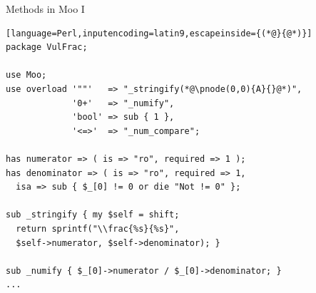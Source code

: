 \documentclass[ngerman,xcolor={table,dvipsnames},scriptsizeer,compress,hyperref={bookmarks,colorlinks}]{beamer}
\begin{document}
\begin{frame}[t,fragile]

\begin{columns}[t]
\begin{column}{.8\textwidth}
\begin{block}{Methods in Moo I}
\scriptsize
\begin{lstlisting}[language=Perl,inputencoding=latin9,escapeinside={(*@}{@*)}]
package VulFrac;

use Moo;
use overload '""'   => "_stringify(*@\pnode(0,0){A}{}@*)",
             '0+'   => "_numify",
             'bool' => sub { 1 },
             '<=>'  => "_num_compare";

has numerator => ( is => "ro", required => 1 );
has denominator => ( is => "ro", required => 1,
  isa => sub { $_[0] != 0 or die "Not != 0" };

sub _stringify { my $self = shift;
  return sprintf("\\frac{%s}{%s}",
  $self->numerator, $self->denominator); }

sub _numify { $_[0]->numerator / $_[0]->denominator; }
...
\end{lstlisting}
\end{block}
\end{column}

\begin{column}{.18\textwidth}
\end{column}
\end{columns}


\end{frame}
\end{document}
